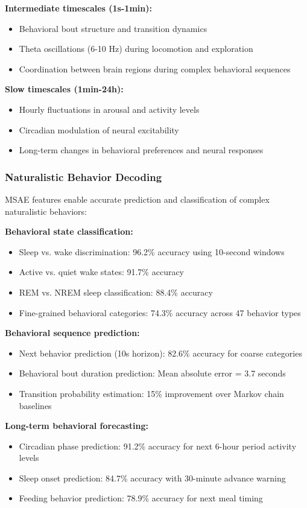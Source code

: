\textbf{Intermediate timescales (1s-1min):}
\begin{itemize}
\item Behavioral bout structure and transition dynamics
\item Theta oscillations (6-10 Hz) during locomotion and exploration
\item Coordination between brain regions during complex behavioral sequences
\end{itemize}

\textbf{Slow timescales (1min-24h):}
\begin{itemize}
\item Hourly fluctuations in arousal and activity levels
\item Circadian modulation of neural excitability
\item Long-term changes in behavioral preferences and neural responses
\end{itemize}

\subsubsection{Naturalistic Behavior Decoding}

MSAE features enable accurate prediction and classification of complex naturalistic behaviors:

\textbf{Behavioral state classification:}
\begin{itemize}
\item Sleep vs. wake discrimination: 96.2\% accuracy using 10-second windows
\item Active vs. quiet wake states: 91.7\% accuracy
\item REM vs. NREM sleep classification: 88.4\% accuracy
\item Fine-grained behavioral categories: 74.3\% accuracy across 47 behavior types
\end{itemize}

\textbf{Behavioral sequence prediction:}
\begin{itemize}
\item Next behavior prediction (10s horizon): 82.6\% accuracy for coarse categories
\item Behavioral bout duration prediction: Mean absolute error = 3.7 seconds
\item Transition probability estimation: 15\% improvement over Markov chain baselines
\end{itemize}

\textbf{Long-term behavioral forecasting:}
\begin{itemize}
\item Circadian phase prediction: 91.2\% accuracy for next 6-hour period activity levels
\item Sleep onset prediction: 84.7\% accuracy with 30-minute advance warning
\item Feeding behavior prediction: 78.9\% accuracy for next meal timing
\end{itemize}

